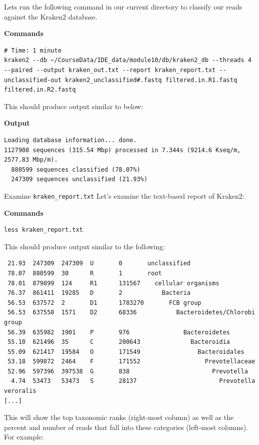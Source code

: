 \documentclass[
]{book}
\begin{document}
Lets run the following command in our current directory to classify our reads against the Kraken2 database.

\textbf{Commands}

\begin{verbatim}
# Time: 1 minute
kraken2 --db ~/CourseData/IDE_data/module10/db/kraken2_db --threads 4 --paired --output kraken_out.txt --report kraken_report.txt --unclassified-out kraken2_unclassified#.fastq filtered.in.R1.fastq filtered.in.R2.fastq
\end{verbatim}

This should produce output similar to below:

\textbf{Output}

\begin{verbatim}
Loading database information... done.
1127908 sequences (315.54 Mbp) processed in 7.344s (9214.6 Kseq/m, 2577.83 Mbp/m).
  880599 sequences classified (78.07%)
  247309 sequences unclassified (21.93%)
\end{verbatim}

Examine \texttt{kraken\_report.txt}
Let's examine the text-based report of Kraken2:

\textbf{Commands}

\begin{verbatim}
less kraken_report.txt
\end{verbatim}

This should produce output similar to the following:

\begin{verbatim}
 21.93  247309  247309  U       0       unclassified
 78.07  880599  30      R       1       root
 78.01  879899  124     R1      131567    cellular organisms
 76.37  861411  19285   D       2           Bacteria
 56.53  637572  2       D1      1783270       FCB group
 56.53  637558  1571    D2      68336           Bacteroidetes/Chlorobi group
 56.39  635982  1901    P       976               Bacteroidetes
 55.10  621496  35      C       200643              Bacteroidia
 55.09  621417  19584   O       171549                Bacteroidales
 53.18  599872  2464    F       171552                  Prevotellaceae
 52.96  597396  397538  G       838                       Prevotella
  4.74  53473   53473   S       28137                       Prevotella veroralis
[...]
\end{verbatim}

This will show the top taxonomic ranks (right-most column) as well as the percent and number of reads that fall into these categories (left-most columns). For example:
\end{document}
